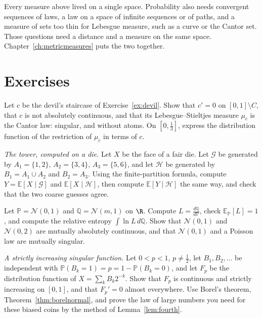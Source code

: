 Every measure above lived on a single space. Probability also needs convergent sequences of laws, a law on a space of infinite sequences or of paths, and a measure of sets too thin for Lebesgue measure, such as a curve or the Cantor set. Those questions need a distance and a measure on the same space. Chapter~\ref{ch:metricmeasures} puts the two together.

\section{Exercises}

\begin{exercise}[$\star$]\label{ex:cantorfn}
Let $c$ be the devil's staircase of Exercise~\ref{ex:devil}. Show that $c'=0$ on $[0,1]\setminus C$, that $c$ is not absolutely continuous, and that its Lebesgue--Stieltjes measure $\mu_c$ is the Cantor law: singular, and without atoms. On $[0,\frac13]$, express the distribution function of the restriction of $\mu_c$ in terms of $c$.
\end{exercise}

\begin{exercise}[$\star$]\label{ex:condexp}
\emph{The tower, computed on a die.} Let $X$ be the face of a fair die. Let $\mathcal G$ be generated by $A_1=\{1,2\}$, $A_2=\{3,4\}$, $A_3=\{5,6\}$, and let $\mathcal H$ be generated by $B_1=A_1\cup A_2$ and $B_2=A_3$. Using the finite-partition formula, compute $Y=\mathbb E[X\mid\mathcal G]$ and $\mathbb E[X\mid\mathcal H]$, then compute $\mathbb E[Y\mid\mathcal H]$ the same way, and check that the two coarse guesses agree.
\end{exercise}

\begin{exercise}[$\star$]\label{ex:likelihood}
Let $\mathbb P=\mathcal N(0,1)$ and $\mathbb Q=\mathcal N(m,1)$ on $\R$. Compute $L=\frac{d\mathbb Q}{d\mathbb P}$, check $\mathbb E_{\mathbb P}[L]=1$, and compute the relative entropy $\int\ln L\,d\mathbb Q$. Show that $\mathcal N(0,1)$ and
$\mathcal N(0,2)$ are mutually absolutely continuous, and that $\mathcal N(0,1)$ and a Poisson law are mutually singular.
\end{exercise}

\begin{exercise}[$\star\star\star$]\label{ex:salem}
\emph{A strictly increasing singular function.} Let $0<p<1$, $p\ne\frac12$, let $B_1,B_2,\ldots$ be independent with $\mathbb P(B_k=1)=p=1-\mathbb P(B_k=0)$, and let $F_p$ be the distribution function of $X=\sum_kB_k2^{-k}$.
Show that $F_p$ is continuous and strictly increasing on $[0,1]$, and that $F_p'=0$ almost everywhere. Use Borel's theorem, Theorem~\ref{thm:borelnormal}, and prove the law of large numbers you need for these biased coins by the method of Lemma~\ref{lem:fourth}.
\end{exercise}

